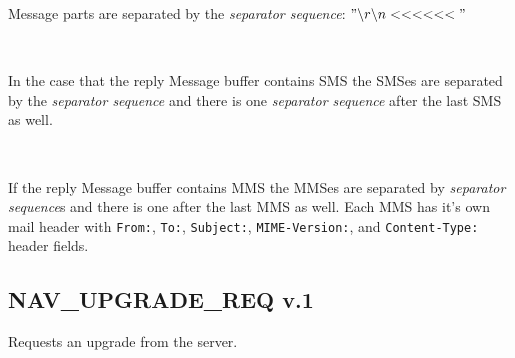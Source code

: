 \documentclass[a4paper]{article}
\begin{document}
Message parts are separated by the \emph{separator sequence}: $"\backslash r\backslash n<<<<<<"$

~

In the case that the reply Message buffer contains SMS the SMSes are
separated by the \emph{separator sequence} and there is one
\emph{separator sequence} after the last SMS as well.

~

If the reply Message buffer contains MMS the MMSes are separated by
\emph{separator sequence}s and there is one after the last MMS as
well.  Each MMS has it's own mail header with {\tt From:}, {\tt To:},
{\tt Subject:}, {\tt MIME-Version:}, and {\tt Content-Type:} header
fields.


\subsection{NAV\_UPGRADE\_REQ v.1}
Requests an upgrade from the server.

%
\end{document}
